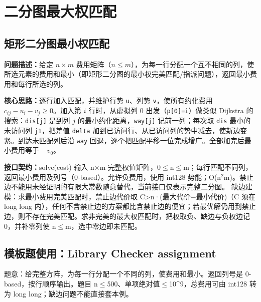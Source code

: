 

\Needspace{180pt}

\section{二分图最大权匹配}

\subsection{矩形二分图最小权匹配}\label{compact-Hungarian}

\noindent\textbf{问题描述：}\allowbreak 给定 $n\times m$ 费用矩阵（$n\le m$），为每一行分配一个互不相同的列，使所选元素的费用和最小（即矩形二分图的最小权完美匹配/指派问题），返回最小费用和每行所选的列。

\textbf{核心思路：}\allowbreak 逐行加入匹配，并维护行势 \texttt{u}、列势 \texttt{v}，使所有约化费用 $c_{ij}-u_i-v_j\ge0$。加入第 $i$ 行时，从虚拟列 0 出发（\texttt{p[0]=i}）做类似 Dijkstra 的搜索：\texttt{dis[j]} 是到列 $j$ 的最小约化距离，\texttt{way[j]} 记前一列；每次取 \texttt{dis} 最小的未访问列 \texttt{j1}，把差值 \texttt{delta} 加到已访问行、从已访问列的势中减去，使新边变紧。到达未匹配列后沿 \texttt{way} 回退，逐个把匹配平移一位完成增广。全部加完后最小费用等于 $-v_0$。



{\sloppy{}\noindent\textbf{接口契约：}solve(cost) 输入 n×m 完整权值矩阵，0$\le$n$\le$m；每行匹配不同列，返回最小费用及列号（0-based）。允许负费用，使用 int128 势能；O(n$^{2}$m)。禁止边不能用未经证明的有限大常数随意替代，当前接口仅表示完整二分图。 缺边建模：求最小费用完美匹配时，禁止边代价取 C>n·(最大代价−最小代价)（C 须在 long long 内），任何不含禁止边的方案都比含禁止边的便宜；若最优解仍用到禁止边，则不存在完美匹配。求非完美的最大权匹配时，把权取负、缺边与负权边记 0，并补零列使 n$\le$m，选中零边即未匹配。\par}



\Needspace{329pt}

\subsection*{模板题使用：Library Checker assignment}

\label{usage-example-80}

题意：给完整方阵，为每一行分配一个不同的列，使费用和最小。返回列号是 0-based，按行顺序输出。题目 n$\le$500、单项绝对值$\le$10\textasciicircum{}9，总费用可由 int128 转为 long long；缺边问题不能直接套本例。

